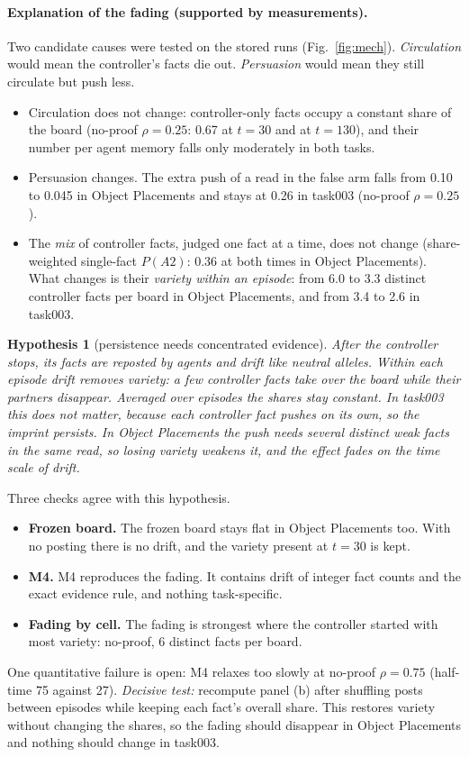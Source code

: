 \documentclass[10pt,a4paper]{article}
\newtheorem{hypothesis}{Hypothesis}
\begin{document}
\paragraph{Explanation of the fading (supported by measurements).} Two candidate causes were tested on the stored runs
(Fig.~\ref{fig:mech}). \emph{Circulation} would mean the controller's facts die out. \emph{Persuasion} would mean they
still circulate but push less.
\begin{itemize}
\item Circulation does not change: controller-only facts occupy a constant share of the board (no-proof $\rho=0.25$:
  0.67 at $t=30$ and at $t=130$), and their number per agent memory falls only moderately in both tasks.
\item Persuasion changes. The extra push of a read in the false arm falls from 0.10 to 0.045 in Object Placements and
  stays at 0.26 in task003 (no-proof $\rho=0.25$).
\item The \emph{mix} of controller facts, judged one fact at a time, does not change (share-weighted single-fact
  $P(A2)$: 0.36 at both times in Object Placements). What changes is their \emph{variety within an episode}: from 6.0 to
  3.3 distinct controller facts per board in Object Placements, and from 3.4 to 2.6 in task003.
\end{itemize}

\begin{hypothesis}[persistence needs concentrated evidence]
After the controller stops, its facts are reposted by agents and drift like neutral alleles. Within each episode drift
removes variety: a few controller facts take over the board while their partners disappear. Averaged over episodes the
shares stay constant. In task003 this does not matter, because each controller fact pushes on its own, so the imprint
persists. In Object Placements the push needs several distinct weak facts in the same read, so losing variety weakens it,
and the effect fades on the time scale of drift.
\end{hypothesis}
Three checks agree with this hypothesis.
\begin{itemize}
\item \textbf{Frozen board.} The frozen board stays flat in Object Placements too. With no posting there is no drift,
  and the variety present at $t=30$ is kept.
\item \textbf{M4.} M4 reproduces the fading. It contains drift of integer fact counts and the exact evidence rule, and
  nothing task-specific.
\item \textbf{Fading by cell.} The fading is strongest where the controller started with most variety: no-proof, 6
  distinct facts per board.
\end{itemize}
One quantitative failure is open: M4 relaxes too slowly at no-proof $\rho=0.75$ (half-time 75 against 27).
\emph{Decisive test:} recompute panel (b) after shuffling posts between episodes while keeping each fact's overall share.
This restores variety without changing the shares, so the fading should disappear in Object Placements and nothing
should change in task003.
\end{document}

